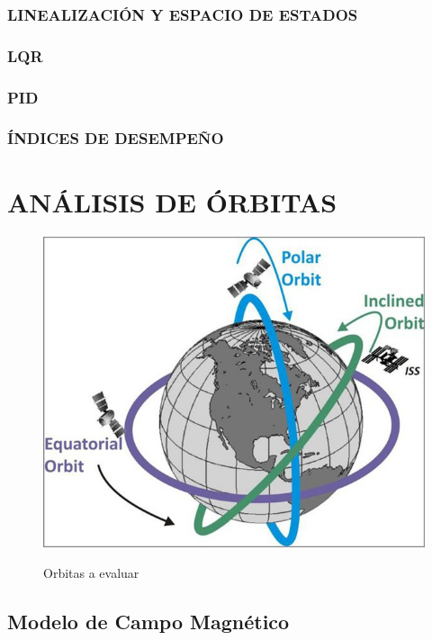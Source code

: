 \subsubsection{LINEALIZACIÓN Y ESPACIO DE ESTADOS}
\subsubsection{LQR}
\subsubsection{PID}
\subsubsection{ÍNDICES DE DESEMPEÑO}
\section{ANÁLISIS DE ÓRBITAS}

\begin{figure}[h]
	\begin{center}
		\includegraphics[scale=0.4]{imagenes/analisis_de_orbitas/orbitas.jpg}\\
	\end{center}
	\caption{Orbitas a evaluar}
	\label{fig:orbitas}
	\textit{}
\end{figure}


\subsection{Modelo de Campo Magnético}

